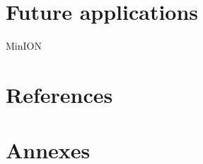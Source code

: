 \documentclass[12pt]{article}
\begin{document}
\section*{Future applications}\label{sec:persp}
MinION \cite{ashton_minion_2015}
\clearpage

\section*{References}


\newpage
\section*{Annexes}
\label{sec:anx}
\setcounter{figure}{0}
\renewcommand{\thefigure}{\Alph{figure}}
\end{document}
